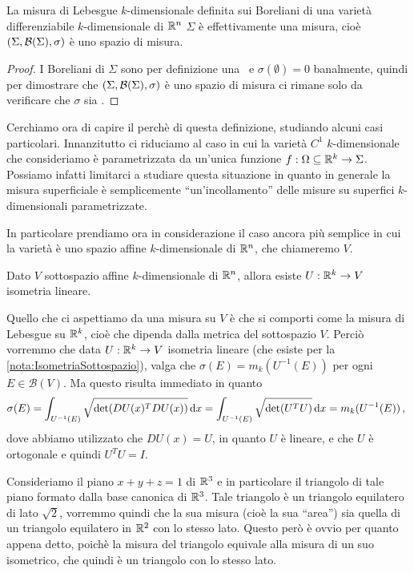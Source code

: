 \begin{theorem}
	La misura di Lebesgue $k$-dimensionale definita sui Boreliani di una varietà differenziabile $k$-dimensionale di $\mathbb R^n$ $\Sigma$ è effettivamente una misura, cioè $(\Sigma,\mathcal B(\Sigma),\sigma)$ è uno spazio di misura.
\end{theorem}
\begin{proof}
	I Boreliani di $\Sigma$ sono per definizione una \sigalg\ e $\sigma(\emptyset)=0$ banalmente, quindi per dimostrare che $(\Sigma,\mathcal B(\Sigma),\sigma)$ è uno spazio di misura ci rimane solo da verificare che $\sigma$ sia \sigadd.
\end{proof}



Cerchiamo ora di capire il perchè di questa definizione, studiando alcuni casi particolari. Innanzitutto ci riduciamo al caso in cui la varietà $C^1$ $k$-dimensionale che consideriamo è parametrizzata da un'unica funzione $f:\Omega\subseteq \mathbb R^k\to\Sigma$. Possiamo infatti limitarci a studiare questa situazione in quanto in generale la misura superficiale è semplicemente ``un'incollamento'' delle misure su superfici $k$-dimensionali parametrizzate. 

In particolare prendiamo ora in considerazione il caso ancora più semplice in cui la varietà è uno spazio affine $k$-dimensionale di $\mathbb R^n$, che chiameremo $V$.

\begin{remark}\label{nota:IsometriaSottospazio}
	Dato $V$ sottospazio affine $k$-dimensionale di $\mathbb R^n$, allora esiste $U:\mathbb R^k\to V$ isometria lineare.
\end{remark}

Quello che ci aspettiamo da una misura su $V$ è che si comporti come la misura di Lebesgue su $\mathbb R^k$, cioè che dipenda dalla metrica del sottospazio $V$. Perciò vorremmo che data $U:\mathbb R^k\to V$ isometria lineare (che esiste per la \cref{nota:IsometriaSottospazio}), valga che $\sigma(E)=m_k(U^{-1}(E))$ per ogni $E\in\mathcal{B}(V)$. Ma questo risulta immediato in quanto
\begin{equation*}
	\sigma(E)=\int_{U^{-1}(E)}\sqrt{\det(DU(x)^TDU(x))}\,\mathrm d x=\int_{U^{-1}(E)}\sqrt{\det(U^TU)}\,\mathrm d x=m_k(U^{-1}(E))\, \text{, }
\end{equation*}
dove abbiamo utilizzato che $DU(x)=U$, in quanto $U$ è lineare, e che $U$ è ortogonale e quindi $U^TU=I$.

\begin{example}
	Consideriamo il piano $x+y+z=1$ di $\mathbb R^3$ e in particolare il triangolo di tale piano formato dalla base canonica di $\mathbb R^3$. Tale triangolo è un triangolo equilatero di lato $\sqrt{2}$, vorremmo quindi che la sua misura (cioè la sua ``area'') sia quella di un triangolo equilatero in $\mathbb R^2$ con lo stesso lato. Questo però è ovvio per quanto appena detto, poichè la misura del triangolo equivale alla misura di un suo isometrico, che quindi è un triangolo con lo stesso lato.
\end{example}